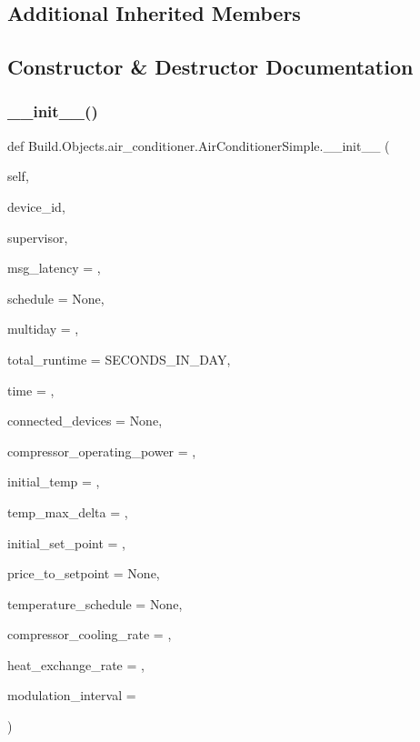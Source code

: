 \subsection*{Additional Inherited Members}


\subsection{Constructor \& Destructor Documentation}
\mbox{\label{class_build_1_1_objects_1_1air__conditioner_1_1_air_conditioner_simple_a851cc811958a860f2796cbb5af4f40da}} 
\subsubsection{\texorpdfstring{\+\_\+\+\_\+init\+\_\+\+\_\+()}{\_\_init\_\_()}}
{\footnotesize\ttfamily def Build.\+Objects.\+air\+\_\+conditioner.\+Air\+Conditioner\+Simple.\+\_\+\+\_\+init\+\_\+\+\_\+ (\begin{DoxyParamCaption}\item[{}]{self,  }\item[{}]{device\+\_\+id,  }\item[{}]{supervisor,  }\item[{}]{msg\+\_\+latency = {},  }\item[{}]{schedule = {\ttfamily None},  }\item[{}]{multiday = {},  }\item[{}]{total\+\_\+runtime = {\ttfamily SECONDS\+\_\+IN\+\_\+DAY},  }\item[{}]{time = {},  }\item[{}]{connected\+\_\+devices = {\ttfamily None},  }\item[{}]{compressor\+\_\+operating\+\_\+power = {},  }\item[{}]{initial\+\_\+temp = {},  }\item[{}]{temp\+\_\+max\+\_\+delta = {},  }\item[{}]{initial\+\_\+set\+\_\+point = {},  }\item[{}]{price\+\_\+to\+\_\+setpoint = {\ttfamily None},  }\item[{}]{temperature\+\_\+schedule = {\ttfamily None},  }\item[{}]{compressor\+\_\+cooling\+\_\+rate = {},  }\item[{}]{heat\+\_\+exchange\+\_\+rate = {},  }\item[{}]{modulation\+\_\+interval = {} }\end{DoxyParamCaption})}


